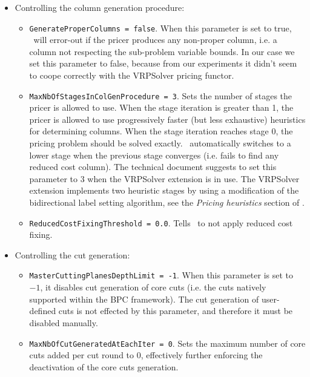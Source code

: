 \begin{itemize}
	\item Controlling the column generation procedure:
	      \begin{itemize}
		      \item \texttt{GenerateProperColumns = false}.
		            When this parameter is set to true, \bapcod\ will error-out if the pricer produces any non-proper column,
		            i.e. a column not respecting the sub-problem variable bounds.
		            In our case we set this parameter to false, because from our experiments it didn't seem to coope correctly with the VRPSolver pricing functor.
		      \item \texttt{MaxNbOfStagesInColGenProcedure = 3}.
		            Sets the number of stages the pricer is allowed to use.
		            When the stage iteration is greater than 1, the pricer is allowed to use
		            progressively faster (but less exhaustive) heuristics for determining columns.
		            When the stage iteration reaches stage 0, the pricing problem should be solved exactly.
		            \bapcod\ automatically switches to a lower stage when the previous stage converges (i.e. fails to find any reduced cost column).
		            The technical document suggests to set this parameter to $3$ when the VRPSolver extension is in use.
		            The VRPSolver extension implements two heuristic stages by using a modification of the bidirectional label setting algorithm, see the \textit{Pricing heuristics} section of \textcite{sadykov2021a}.
		      \item \texttt{ReducedCostFixingThreshold = 0.0}.
		            Tells \bapcod\ to not apply reduced cost fixing.
	      \end{itemize}

	\item Controlling the cut generation:
	      \begin{itemize}
		      \item \texttt{MasterCuttingPlanesDepthLimit = -1}.
		            When this parameter is set to $-1$, it disables cut generation of core cuts
		            (i.e. the cuts natively supported within the BPC framework).
		            The cut generation of user-defined cuts
		            is not effected by this parameter, and therefore it must be disabled manually.
		      \item \texttt{MaxNbOfCutGeneratedAtEachIter = 0}.
		            Sets the maximum number of core cuts added per cut round to $0$,
		            effectively further enforcing the deactivation of the core cuts generation.
	      \end{itemize}


\end{itemize}
